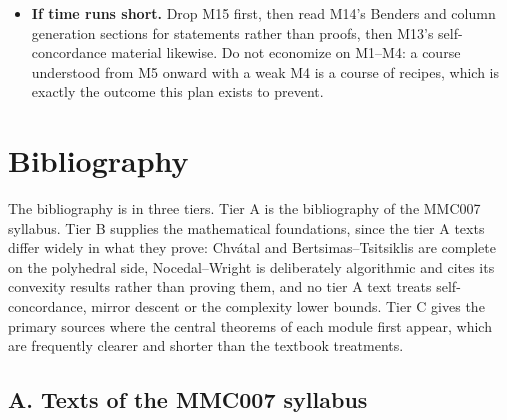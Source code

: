 \documentclass[11pt,a4paper]{article}
\begin{document}
\begin{itemize}
\item \textbf{If time runs short.} Drop M15 first, then read M14's Benders and column
generation sections for statements rather than proofs, then M13's self-concordance material
likewise. Do not economize on M1--M4: a course understood from M5 onward with a weak M4 is a
course of recipes, which is exactly the outcome this plan exists to prevent.
\end{itemize}

\clearpage

\section{Bibliography}
\label{sec:bib}

The bibliography is in three tiers. Tier A is the bibliography of the MMC007 syllabus. Tier B
supplies the mathematical foundations, since the tier A texts differ widely in what they prove:
Chv\'atal and Bertsimas--Tsitsiklis are complete on the polyhedral side, Nocedal--Wright is
deliberately algorithmic and cites its convexity results rather than proving them, and no tier
A text treats self-concordance, mirror descent or the complexity lower bounds. Tier C gives the
primary sources where the central theorems of each module first appear, which are frequently
clearer and shorter than the textbook treatments.

\subsection*{A. Texts of the MMC007 syllabus}
\end{document}
